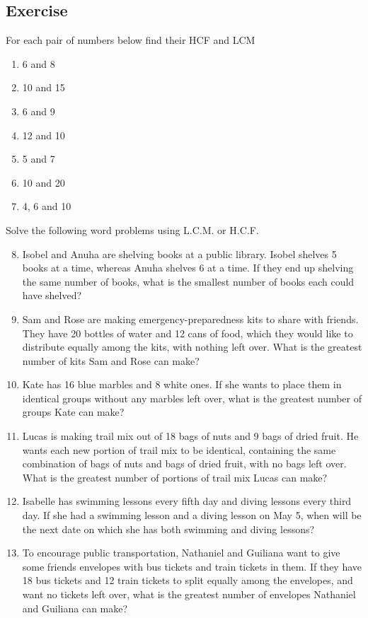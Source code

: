\subsection{Exercise}
For each pair of numbers below find their HCF and LCM
\begin{enumerate}
	\item 6 and 8
	\item 10 and 15
	\item 6 and 9
	\item 12 and 10
	\item 5 and 7
	\item 10 and 20
	\item 4, 6 and 10
\end{enumerate}
Solve the following word problems using L.C.M. or H.C.F.
\begin{enumerate}
	\setcounter{enumi}{7}
	\item Isobel and Anuha are shelving books at a public library. Isobel shelves 5 books at a time, whereas Anuha shelves 6 at a time. If they end up shelving the same number of books, what is the smallest number of books each could have shelved?
	\item Sam and Rose are making emergency-preparedness kits to share with friends. They have 20 bottles of water and
12 cans of food, which they would like to distribute equally among the kits, with nothing left over. What is the greatest number of kits Sam and Rose can make?
	\item Kate has 16 blue marbles and 8 white ones. If she wants to place them in identical groups without any marbles left over, what is the greatest number of groups Kate can make?
	\item Lucas is making trail mix out of 18 bags of nuts and 9 bags of dried fruit. He wants each new portion of trail mix to be identical, containing the same combination of bags of nuts and bags of dried fruit, with no bags left over. What is the greatest number of portions of trail mix Lucas can make?
	\item Isabelle has swimming lessons every fifth day and diving lessons every third day. If she had a swimming lesson and a diving lesson on May 5, when will be the next date on which she has both swimming and diving lessons?
	\item To encourage public transportation, Nathaniel and Guiliana want to give some friends envelopes with bus tickets and train tickets in them. If they have 18 bus tickets and 12 train tickets to split equally among the envelopes, and want no tickets left over, what is the greatest number of envelopes Nathaniel and Guiliana can make?
\end{enumerate}
